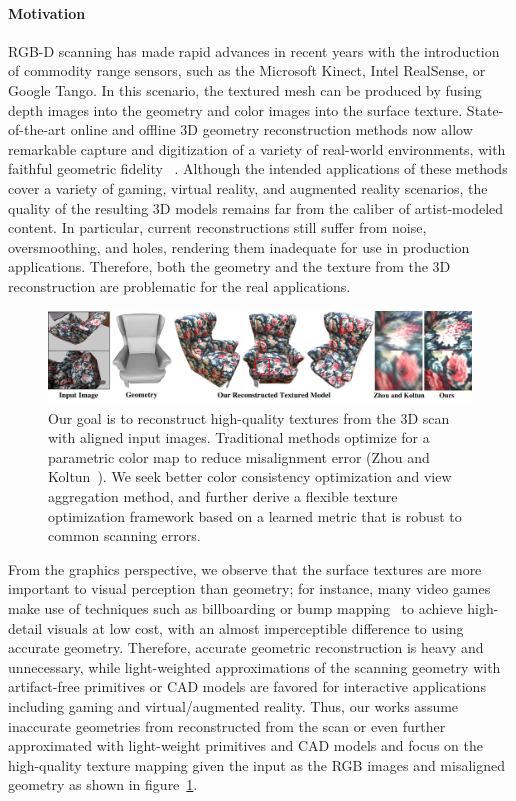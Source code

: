 \paragraph*{Motivation} RGB-D scanning has made rapid advances in recent years with the introduction of commodity range sensors, such as the Microsoft Kinect, Intel RealSense, or Google Tango. In this scenario, the textured mesh can be produced by fusing depth images into the geometry and color images into the surface texture.
State-of-the-art online and offline 3D geometry reconstruction methods now allow remarkable capture and digitization of a variety of real-world environments, with faithful geometric fidelity~ \cite{newcombe2011kinectfusion,izadi2011kinectfusion,chen2013scalable,niessner2013real,choi2015robust,dai2016bundlefusion}.
Although the intended applications of these methods cover a variety of gaming, virtual reality, and augmented reality scenarios, the quality of the resulting 3D models remains far from the caliber of artist-modeled content.
In particular, current reconstructions still suffer from noise, oversmoothing, and holes, rendering them inadequate for use in production applications. Therefore, both the geometry and the texture from the 3D reconstruction are problematic for the real applications.

\begin{figure}
    \centering
    \includegraphics[width=\textwidth]{texturegen/figures/teaser-n.pdf}
    \caption{Our goal is to reconstruct high-quality textures from the 3D scan with aligned input images. Traditional methods optimize for a parametric color map to reduce misalignment error (Zhou and Koltun~\cite{zhou2014color}). We seek better color consistency optimization and view aggregation method, and further derive a flexible texture optimization framework based on a learned metric that is robust to common scanning errors.}
    \label{fig:toptim-teaser}
\end{figure}
From the graphics perspective, we observe that the surface textures are more important to visual perception than geometry; for instance, many video games make use of techniques such as billboarding or bump mapping~\cite{decoret1999multi}
to achieve high-detail visuals at low cost, with an almost imperceptible difference to using accurate geometry. Therefore, accurate geometric reconstruction is heavy and unnecessary, while light-weighted approximations of the scanning geometry with artifact-free primitives or CAD models are favored for interactive applications including gaming and virtual/augmented reality. 
Thus, our works assume inaccurate geometries from reconstructed from the scan or even further approximated with light-weight primitives and CAD models and focus on the high-quality texture mapping given the input as the RGB images and misaligned geometry as shown in figure~\ref{fig:toptim-teaser}.

